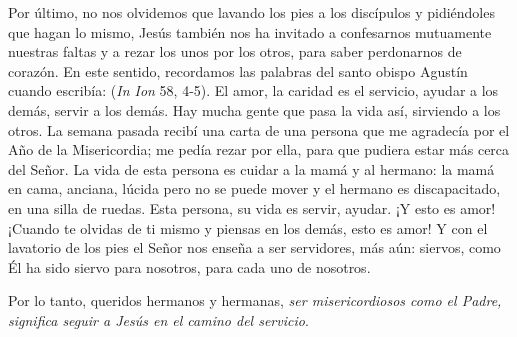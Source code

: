 \begin{body}
Por último, no nos olvidemos que lavando los pies a los discípulos y pidiéndoles que hagan lo mismo, Jesús también nos ha invitado a confesarnos mutuamente nuestras faltas y a rezar los unos por los otros, para saber perdonarnos de corazón. En este sentido, recordamos las palabras del santo obispo Agustín cuando escribía:  (\textit{In Ion} 58, 4-5). El amor, la caridad es el servicio, ayudar a los demás, servir a los demás. Hay mucha gente que pasa la vida así, sirviendo a los otros. La semana pasada recibí una carta de una persona que me agradecía por el Año de la Misericordia; me pedía rezar por ella, para que pudiera estar más cerca del Señor. La vida de esta persona es cuidar a la mamá y al hermano: la mamá en cama, anciana, lúcida pero no se puede mover y el hermano es discapacitado, en una silla de ruedas. Esta persona, su vida es servir, ayudar. ¡Y esto es amor! ¡Cuando te olvidas de ti mismo y piensas en los demás, esto es amor! Y con el lavatorio de los pies el Señor nos enseña a ser servidores, más aún: siervos, como Él ha sido siervo para nosotros, para cada uno de nosotros.

Por lo tanto, queridos hermanos y hermanas, \textit{ser misericordiosos como el Padre, significa seguir a Jesús en el camino del servicio}.
\end{body}

